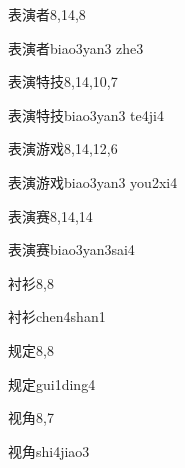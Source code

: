 \begin{entry}{表演者}{8,14,8}
  \begin{phonetics}{表演者}{biao3yan3 zhe3}
  \end{phonetics}
\end{entry}

\begin{entry}{表演特技}{8,14,10,7}
  \begin{phonetics}{表演特技}{biao3yan3 te4ji4}
  \end{phonetics}
\end{entry}

\begin{entry}{表演游戏}{8,14,12,6}
  \begin{phonetics}{表演游戏}{biao3yan3 you2xi4}
  \end{phonetics}
\end{entry}

\begin{entry}{表演赛}{8,14,14}
  \begin{phonetics}{表演赛}{biao3yan3sai4}
  \end{phonetics}
\end{entry}

\begin{entry}{衬衫}{8,8}
  \begin{phonetics}{衬衫}{chen4shan1}
  \end{phonetics}
\end{entry}

\begin{entry}{规定}{8,8}
  \begin{phonetics}{规定}{gui1ding4}
  \end{phonetics}
\end{entry}

\begin{entry}{视角}{8,7}
  \begin{phonetics}{视角}{shi4jiao3}
  \end{phonetics}
\end{entry}

